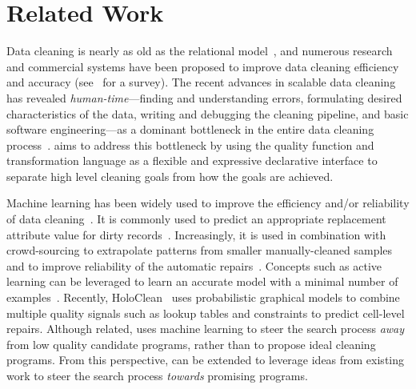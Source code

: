 \section{Related Work}
Data cleaning is nearly as old as the relational model~\cite{codd1970relational}, and numerous research and  commercial systems have been proposed to improve data cleaning efficiency and accuracy (see~\cite{rahm2000data} for a survey).
The recent advances in scalable data cleaning~\cite{wang1999sample, khayyat2015bigdansing, altowim2014progressive} has revealed {\it human-time}---finding and understanding errors, formulating desired characteristics of the data, writing and debugging the cleaning pipeline, and basic software engineering---as a dominant bottleneck in the entire data cleaning process~\cite{krishnan2016hilda}.  
\sys aims to address this bottleneck by using the quality function and transformation language as a flexible and expressive declarative interface to separate high level cleaning goals from how the goals are achieved.  



 Machine learning has been widely used to improve the efficiency and/or reliability of data cleaning~\cite{DBLP:journals/pvldb/YakoutENOI11,yakout2013don,gokhale2014corleone}.
It is commonly used to predict an appropriate replacement attribute value for dirty records~\cite{yakout2013don}.
Increasingly, it is used in combination with crowd-sourcing to extrapolate patterns from smaller manually-cleaned samples~\cite{gokhale2014corleone,DBLP:journals/pvldb/YakoutENOI11} and to improve reliability of the automatic repairs~\cite{DBLP:journals/pvldb/YakoutENOI11}.
Concepts such as active learning can be leveraged to learn an accurate model with a minimal number of examples~\cite{DBLP:journals/pvldb/MozafariSFJM14}.
Recently, HoloClean~\cite{rekatsinas2017holoclean} uses probabilistic graphical models to combine multiple quality signals such as lookup tables and constraints to predict cell-level repairs.
Although related, \sys uses machine learning to steer the search process {\it away} from low quality candidate programs, rather than to propose ideal cleaning programs.  From this perspective, \sys can be extended to leverage ideas from existing work to steer the search process {\it towards} promising programs.  

